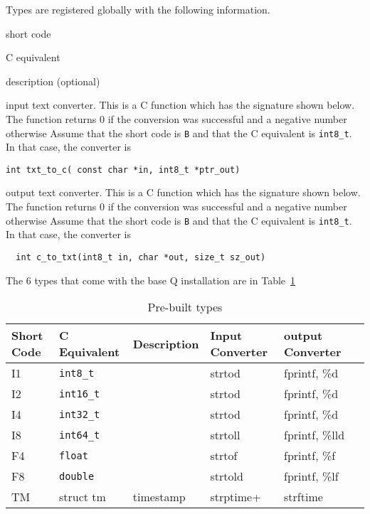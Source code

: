 \documentclass[letterpaper]{article}
\begin{document}
Types are registered globally with the following information. 
\be
\item short code 
\item C equivalent
\item description (optional)
\item input text converter. This is a C function which has the
  signature shown below. 
The function returns 0 if the conversion was successful and a
  negative number otherwise
  Assume that the short code
  is {\tt B} and that the C equivalent is \verb+int8_t+. In that case, the
  converter is 
  \begin{verbatim}
int txt_to_c( const char *in, int8_t *ptr_out)
\end{verbatim}
\item output text converter. This is a C function which has the
  signature shown below. 
The function returns 0 if the conversion was successful and a
  negative number otherwise
  Assume that the short code
  is {\tt B} and that the C equivalent is \verb+int8_t+. In that case, the
  converter is 
  \begin{verbatim}
  int c_to_txt(int8_t in, char *out, size_t sz_out)
\end{verbatim}
  \ee

The 6 types that come with the base Q installation are in
Table~\ref{tbl_default_types}

\begin{table}[hb]
\centering
\begin{tabular}{|l|l|l|l|l|l|} \hline \hline
  {\bf Short Code} & {\bf C Equivalent} & {\bf Description} %
  & {\bf Input Converter} & {\bf output Converter} \\ \hline \hline
  I1 & \verb+int8_t+ &  & strtod & fprintf, \%d\\ \hline
  I2 & \verb+int16_t+ & & strtod & fprintf, \%d\\ \hline
  I4 & \verb+int32_t+ & & strtod & fprintf, \%d\\ \hline
  I8 & \verb+int64_t+ & & strtoll & fprintf, \%lld \\ \hline
  F4 & \verb+float+ &   & strtof & fprintf, \%f\\ \hline
  F8 & \verb+double+ &  & strtold & fprintf, \%lf\\ \hline
  TM & struct tm & timestamp & strptime+ & strftime \\ \hline
\hline
\end{tabular}
\caption{Pre-built types}
\label{tbl_default_types}
\end{table}
\end{document}
